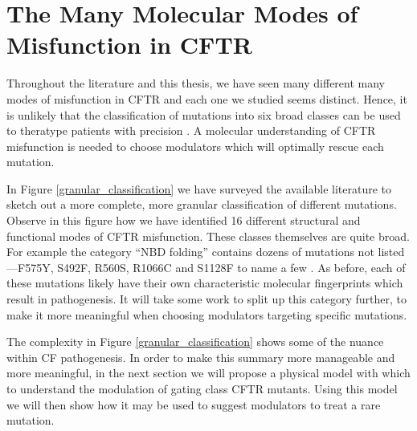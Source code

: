 \section{The Many Molecular Modes of Misfunction in CFTR}

Throughout the literature and this thesis, we have seen many different many modes of misfunction in CFTR and each one we studied seems distinct. Hence, it is unlikely that the classification of mutations into six broad classes can be used to theratype patients with precision \cite{veit2016}. A molecular understanding of CFTR misfunction is needed to choose modulators which will optimally rescue each mutation.

In Figure \ref{granular_classification} we have surveyed the available literature to sketch out a more complete, more granular classification of different mutations. Observe in this figure how we have identified 16 different structural and functional modes of CFTR misfunction. These classes themselves are quite broad. For example the category ``NBD folding'' contains dozens of mutations not listed---F575Y, S492F, R560S, R1066C and S1128F to name a few \cite{awatade2019, lopes-pacheco2016, casals1997, cotten1996, penmatsa2009}. As before, each of these mutations likely have their own characteristic molecular fingerprints which result in pathogenesis. It will take some work to split up this category further, to make it more meaningful when choosing modulators targeting specific mutations.

The complexity in Figure \ref{granular_classification} shows some of the nuance within CF pathogenesis. In order to make this summary more manageable and more meaningful, in the next section we will propose a physical model with which to understand the modulation of gating class CFTR mutants. Using this model we will then show how it may be used to suggest modulators to treat a rare mutation.

